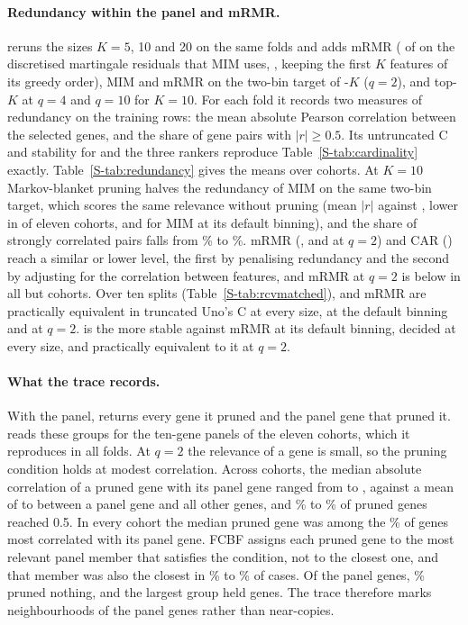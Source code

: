 \paragraph{Redundancy within the panel and mRMR.}  reruns the
sizes $K = 5$, 10 and 20 on the same folds and adds mRMR ( of  on
the discretised martingale residuals that MIM uses, \citealp{kursa2021}, keeping the first
$K$ features of its greedy order), MIM and mRMR on the two-bin target of -$K$
($q = 2$), and top-$K$ at $q = 4$ and $q = 10$ for $K = 10$. For each fold it records two
measures of redundancy on the training rows: the mean absolute Pearson correlation
between the selected genes, and the share of gene pairs with $|r| \ge 0.5$. Its
untruncated C and stability for  and the three rankers reproduce
Table~\ref{S-tab:cardinality} exactly. Table~\ref{S-tab:redundancy} gives the means over
cohorts. At $K = 10$ Markov-blanket pruning halves the redundancy of MIM on the same
two-bin target, which scores the same relevance without pruning (mean $|r|$ \SuppRedTopk{}
against \SuppRedMimQtwo, lower in \SuppRedBelowMimQtwo{} of eleven cohorts, and
\SuppRedMim{} for MIM at its default binning), and the share of strongly correlated pairs
falls from \SuppShareMim\% to \SuppShareTopk\%. mRMR (\SuppRedMrmr, and \SuppRedMrmrQtwo{}
at $q = 2$) and CAR (\SuppRedCar) reach a similar or lower level, the first by penalising
redundancy and the second by adjusting for the correlation between features, and mRMR at
$q = 2$ is below  in all but \SuppRedBelowMrmrQtwo{} cohorts. Over ten splits
(Table~\ref{S-tab:rcvmatched}),  and mRMR are practically equivalent in
truncated Uno's C at every size, at the default binning and at $q = 2$.  is
the more stable against mRMR at its default binning, decided at every size, and
practically equivalent to it at $q = 2$.

\paragraph{What the trace records.} With the panel,  returns every gene it
pruned and the panel gene that pruned it.  reads these groups for the
ten-gene panels of the eleven cohorts, which it reproduces in all \SuppGrpFolds{} folds. At
$q = 2$ the relevance of a gene is small, so the pruning condition holds at modest
correlation. Across cohorts, the median absolute correlation of a pruned gene with its
panel gene ranged from \SuppGrpRMin{} to \SuppGrpRMax, against a mean of \SuppGrpBgMin{}
to \SuppGrpBgMax{} between a panel gene and all other genes, and \SuppGrpHalfMin\% to
\SuppGrpHalfMax\% of pruned genes reached 0.5. In every cohort the median pruned gene was
among the \SuppGrpTopPct\% of genes most correlated with its panel gene. FCBF assigns each
pruned gene to the most relevant panel member that satisfies the condition, not to the
closest one, and that member was also the closest in \SuppGrpClosestMin\% to
\SuppGrpClosestMax\% of cases. Of the panel genes, \SuppGrpEmpty\% pruned nothing, and the
largest group held \SuppGrpMaxGroup{} genes. The trace therefore marks neighbourhoods of
the panel genes rather than near-copies.

